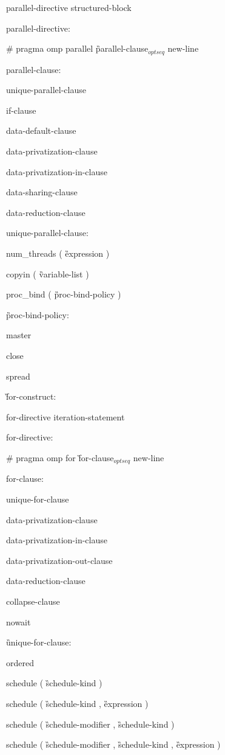 {\I parallel-directive structured-block

parallel-directive:

\C\I \# pragma omp parallel \G parallel-clause$_{optseq}$ new-line

parallel-clause:

\I unique-parallel-clause

\I if-clause

\I data-default-clause 

\I data-privatization-clause 

\I data-privatization-in-clause 

\I data-sharing-clause 

\I data-reduction-clause 

unique-parallel-clause:

\C\I num\_threads ( \G expression \C )

\C\I copyin ( \G variable-list \C )

\I proc\_bind ( \G proc-bind-policy \C )

\G proc-bind-policy:

\C\I master

\I close

\I spread

\G for-construct:

\I for-directive iteration-statement

for-directive:

\C\I \# pragma omp for \G for-clause$_{optseq}$ new-line

for-clause:

\I unique-for-clause

\I data-privatization-clause 

\I data-privatization-in-clause 

\I data-privatization-out-clause 

\I data-reduction-clause 

\I collapse-clause

\C\I nowait

\G unique-for-clause:

\C\I ordered

\I schedule ( \G schedule-kind \C )

\I schedule ( \G schedule-kind \C, \G expression \C )

\I schedule ( \G schedule-modifier \C, \G schedule-kind \C )

\I schedule ( \G schedule-modifier \C, \G schedule-kind \C, \G expression \C )

}
